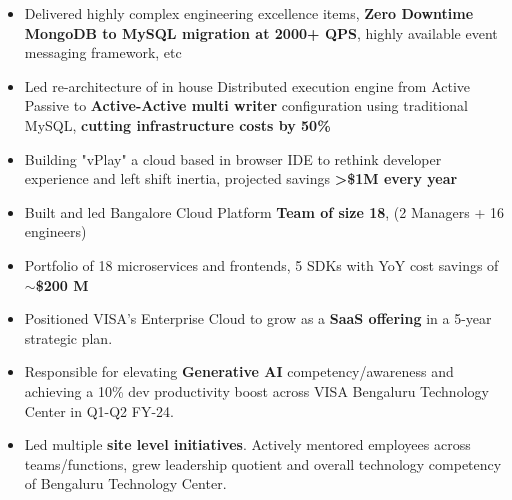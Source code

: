 \documentclass[10pt,a4paper,ragged2e,withhyper]{altacv}
\begin{document}
\begin{paracol}{2}


\begin{itemize}
  \item Delivered highly complex engineering excellence items, \textbf{Zero Downtime MongoDB to MySQL migration at 2000+ QPS}, highly available event messaging framework, etc
  \item Led re-architecture of in house Distributed execution engine from Active Passive to \textbf{Active-Active multi writer} configuration using traditional MySQL, \textbf{cutting infrastructure costs by 50\%}
  \item Building "vPlay" a cloud based in browser IDE to rethink developer experience and left shift inertia, projected savings \textbf{>\$1M every year}
  \item Built and led Bangalore Cloud Platform \textbf{Team of size 18}, (2 Managers + 16 engineers) 
  \item Portfolio of 18 microservices and frontends, 5 SDKs with YoY cost savings of \textbf{\(\sim\)\$200 M}
  \item Positioned VISA's Enterprise Cloud to grow as a \textbf{SaaS offering} in a 5-year strategic plan.
  \item Responsible for elevating \textbf{Generative AI} competency/awareness and achieving a 10\% dev productivity boost across VISA Bengaluru Technology Center in Q1-Q2 FY-24.
  \item Led multiple \textbf{site level initiatives}. Actively mentored employees across teams/functions, grew leadership quotient and overall technology competency of Bengaluru Technology Center.
\end{itemize}

\divider


\end{paracol}
\end{document}

